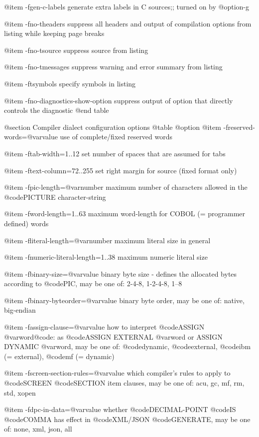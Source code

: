 @item -fgen-c-labels
generate extra labels in C sources;; turned on by @option{-g}

@item -fno-theaders
suppress all headers and output of compilation
options from listing while keeping page breaks

@item -fno-tsource
suppress source from listing

@item -fno-tmessages
suppress warning and error summary from listing

@item -ftsymbols
specify symbols in listing

@item -fno-diagnostics-show-option
suppress output of option that directly
controls the diagnostic
@end table

@section Compiler dialect configuration options
@table @option
@item -freserved-words=@var{value}
use of complete/fixed reserved words

@item -ftab-width=1..12
set number of spaces that are assumed for tabs

@item -ftext-column=72..255
set right margin for source (fixed format only)

@item -fpic-length=@var{number}
maximum number of characters allowed in the @code{PICTURE} character-string

@item -fword-length=1..63
maximum word-length for COBOL (= programmer defined) words

@item -fliteral-length=@var{number}
maximum literal size in general

@item -fnumeric-literal-length=1..38
maximum numeric literal size

@item -fbinary-size=@var{value}
binary byte size - defines the allocated bytes according to @code{PIC}, may be one of: 2-4-8, 1-2-4-8, 1--8

@item -fbinary-byteorder=@var{value}
binary byte order, may be one of: native, big-endian

@item -fassign-clause=@var{value}
how to interpret @code{ASSIGN @var{word}@code{: as @code{ASSIGN EXTERNAL @var{word}} or }ASSIGN DYNAMIC @var{word}}, may be one of: @code{dynamic}, @code{external}, @code{ibm} (= external), @code{mf} (= dynamic)

@item -fscreen-section-rules=@var{value}
which compiler's rules to apply to @code{SCREEN} @code{SECTION} item clauses, may be one of: acu, gc, mf, rm, std, xopen

@item -fdpc-in-data=@var{value}
whether @code{DECIMAL-POINT} @code{IS} @code{COMMA} has effect in @code{XML/JSON} @code{GENERATE}, may be one of: none, xml, json, all


